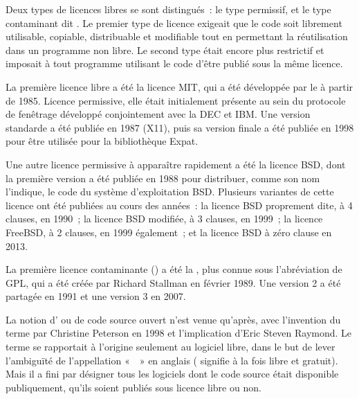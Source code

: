 Deux types de licences libres se sont distingués~: le type permissif, et le type contaminant dit . Le premier type de licence exigeait que le code soit librement utilisable, copiable, distribuable et modifiable tout en permettant la réutilisation dans un programme non libre. Le second type était encore plus restrictif et imposait à tout programme utilisant le code d'être publié sous la même licence.

La première licence libre a été la licence MIT, qui a été développée par le  à partir de 1985. Licence permissive, elle était initialement présente au sein du protocole de fenêtrage  développé conjointement avec la DEC et IBM. Une version standarde a été publiée en 1987 (X11), puis sa version finale a été publiée en 1998 pour être utilisée pour la bibliothèque Expat.

Une autre licence permissive à apparaître rapidement a été la licence BSD, dont la première version a été publiée en 1988 pour distribuer, comme son nom l'indique, le code du système d'exploitation BSD. Plusieurs variantes de cette licence ont été publiées au cours des années~: la licence BSD proprement dite, à 4 clauses, en 1990~; la licence BSD modifiée, à 3 clauses, en 1999~; la licence FreeBSD, à 2 clauses, en 1999 également~; et la licence BSD à zéro clause en 2013.

La première licence contaminante () a été la , plus connue sous l'abréviation de GPL, qui a été créée par Richard Stallman en février 1989. Une version 2 a été partagée en 1991 et une version 3 en 2007.

La notion d' ou de code source ouvert n'est venue qu'après, avec l'invention du terme par Christine Peterson en 1998 et l'implication d'Eric Steven Raymond. Le terme se rapportait à l'origine seulement au logiciel libre, dans le but de lever l'ambiguïté de l'appellation «~~» en anglais ( signifie à la fois libre et gratuit). Mais il a fini par désigner tous les logiciels dont le code source était disponible publiquement, qu'ils soient publiés sous licence libre ou non.

